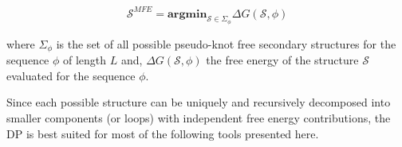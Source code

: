\begin{equation}
\mathcal{S}^{MFE} =  \textbf{argmin}_{\mathcal{S} \in \Sigma_{\phi}} \Delta G(\mathcal{S}, \phi) 
\end{equation}

where $\Sigma_{\phi}$ is the set of all possible pseudo-knot free secondary structures for the sequence $\phi$ of length $L$ and, $\Delta G(\mathcal{S}, \phi)$ the free energy of the structure $\mathcal{S}$ evaluated for the sequence $\phi$.

Since each possible structure can be uniquely and recursively decomposed into smaller components (or loops) with independent free energy contributions, the \ac{DP} is best suited for most of the following tools presented here.

